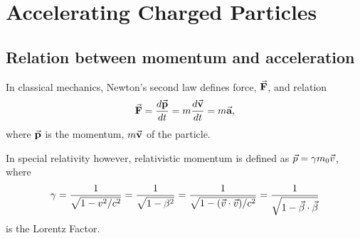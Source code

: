 \documentclass[a4paper,oneside,12pt]{report}
\numberwithin{equation}{chapter}
\begin{document}
\newpage
\section{Accelerating Charged Particles}

\subsection{Relation between momentum and acceleration}
In classical mechanics, Newton's second law defines force, $\vec{\textbf{F}}$, and relation
\vspace{-10pt}
\begin{equation} \label{eq:newton_second_law}
    \vecthreeBF{F} = \frac{d \vecthreeBF{p}}{d t} = m \frac{d \vecthreeBF{v}}{d t} = m \vecthreeBF{a}   ,
    \vspace{-10pt}
\end{equation}
where $\vec{\textbf{p}}$ is the momentum, $m\vec{\textbf{v}}$ of the particle. 


In special relativity however, relativistic momentum is defined as $\vec{p} = \gamma m_0 \vec{v} $, where 
\vspace{-10pt}
\begin{equation}
    \gamma = \frac{1}{\sqrt{1-v^2 / c^2}} = \frac{1}{\sqrt{1-\beta^2}}
            = \frac{1}{\sqrt{1- (\dotProd{v}{v})/ c^2}} =  \frac{1}{\sqrt{1- \dotProd{\beta}{\beta}}}
            \vspace{-10pt}
\end{equation} is the Lorentz Factor.
\end{document}
